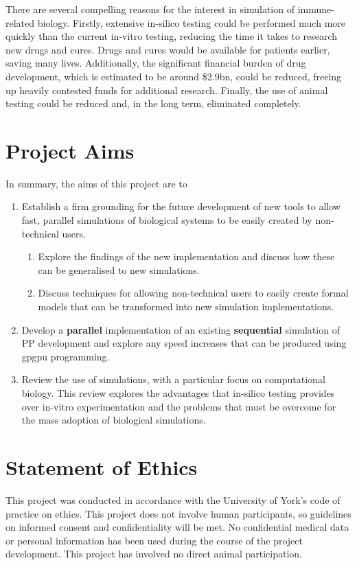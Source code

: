 \documentclass{UoYCSproject}
\begin{document}
There are several compelling reasons for the interest in simulation of immune-related biology.
Firstly, extensive \gls{in-silico} testing could be performed much more quickly than the current \gls{in-vitro} testing, reducing the time it takes to research new drugs and cures.
Drugs and cures would be available for patients earlier, saving many lives.
Additionally, the significant financial burden of drug development, which is estimated to be around \$2.9bn\cite{drug_cost}, could be reduced, freeing up heavily contested funds for additional research. Finally, the use of animal testing could be reduced and, in the long term, eliminated completely.

\section{Project Aims}
In summary, the aims of this project are to
\begin{enumerate}
    \item Establish a firm grounding for the future development of new tools to allow fast, parallel simulations of biological systems to be easily created by non-technical users.
    \begin{enumerate}
        \item Explore the findings of the new implementation and discuss how these can be generalised to new simulations.
        \item Discuss techniques for allowing non-technical users to easily create formal models that can be transformed into new simulation implementations.
    \end{enumerate}
    \item Develop a \textbf{parallel} implementation of an existing \textbf{sequential} simulation of \gls{PP} development and explore any speed increases that can be produced using \gls{gpgpu} programming.
    \item Review the use of simulations, with a particular focus on computational biology. This review explores the advantages that in-silico testing provides over \gls{in-vitro} experimentation and the problems that must be overcome for the mass adoption of biological simulations.
    
\end{enumerate}

\section{Statement of Ethics}
This project was conducted in accordance with the University of York's code of practice on ethics.
This project does not involve human participants, so guidelines on informed consent and confidentiality will be met. No confidential medical data or personal information has been used during the course of the project development. This project has involved no direct animal participation.
\end{document}
